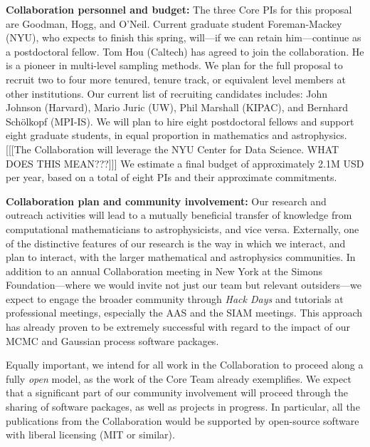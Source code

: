 \documentclass[11pt]{article}
\renewcommand{\paragraph}[1]{\smallskip\par\noindent\textbf{{#1}:}}
\begin{document}
\paragraph{Collaboration personnel and budget}
The three Core PIs for this proposal are Goodman, Hogg, and O'Neil.
Current graduate student Foreman-Mackey (NYU), who expects to finish
this spring, will---if we can retain him---continue as a postdoctoral
fellow.
Tom Hou (Caltech) has agreed to join the collaboration.
He is a pioneer in multi-level sampling methods.
We plan for the full proposal to recruit two to four more tenured,
tenure track, or equivalent level members at other institutions.  Our
current list of recruiting candidates includes: John
Johnson (Harvard), Mario Juric (UW), Phil Marshall (KIPAC), and Bernhard
Sch\"olkopf (MPI-IS).
We will plan to hire eight postdoctoral fellows and support eight
graduate students, in equal proportion in mathematics and astrophysics.
[[[The Collaboration will leverage the NYU Center for Data Science. WHAT
DOES THIS MEAN???]]]
We estimate a final budget of approximately 2.1M USD per year,
based on a total of eight PIs and their approximate commitments.

\paragraph{Collaboration plan and community involvement}
Our research and outreach activities will lead to a mutually beneficial
transfer of knowledge from computational mathematicians to
astrophysicists, and vice versa.
Externally, one of the distinctive features of our research is the way
in which we interact, and plan to interact, with the larger mathematical
and astrophysics communities.
In addition to an annual Collaboration meeting in New York at the Simons
Foundation---where we would invite not just our team but relevant
outsiders---we expect to engage the broader community through \emph{Hack
Days} and tutorials at professional meetings, especially the AAS and the 
SIAM meetings.
This approach has already proven to be extremely successful with regard
to the impact of our MCMC and Gaussian process software packages.

Equally important, we intend for all work in the Collaboration to
proceed along a fully \emph{open} model, as the work of the Core Team
already exemplifies.
We expect that a significant part of our community involvement will
proceed through the sharing of software packages, as well as projects in
progress.
In particular, all the publications from the Collaboration would be
supported by open-source software with liberal licensing (MIT or similar).
\end{document}
